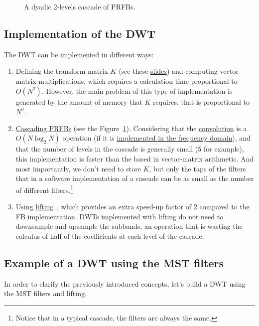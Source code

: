 \begin{figure}
  \centering
  \caption{A dyadic 2-levels cascade of PRFBs.}
  \label{fig:cascade}
\end{figure}

\subsection{Implementation of the DWT}
The DWT can be implemented in different ways:
\begin{enumerate}
\item Defining the transform matrix $K$ (see these
  \href{https://cseweb.ucsd.edu/classes/fa17/cse166-a/lec13.pdf}{slides})
  and computing vector-matrix multiplications, which requires a
  calculation time proportional to $O(N^2)$. However, the main problem
  of this type of implementation is generated by the amount of memory
  that $K$ requires, that is proportional to $N^2$.
\item
  \href{https://en.wikipedia.org/wiki/Discrete_wavelet_transform#Cascading_and_filter_banks}{Cascading
    PRFBs} (see the Figure~\ref{fig:cascade}). Considering that the
  \href{https://en.wikipedia.org/wiki/Convolution}{convolution} is a
  $O(N\log_2N)$ operation (if it is
  \href{https://en.wikipedia.org/wiki/Convolution_theorem}{implemented
    in the frequency domain}), and that the number of levels in the
  cascade is generally small (5 for example), this implementation is
  faster than the based in vector-matrix arithmetic. And most
  importantly, we don't need to store $K$, but only the taps of the
  filters that in a software implementation of a cascade can be as
  small as the number of different filters.\footnote{Notice that in a
    typical cascade, the filters are always the same.}
\item Using
  \href{https://en.wikipedia.org/wiki/Lifting_scheme}{lifting}~\cite{sweldens1997building},
  which provides an extra speed-up factor of 2 compared to the FB
  implementation. DWTs implemented with lifting do not need to
  downsample and upsample the subbands, an operation that is wasting
  the calculus of half of the coefficients at each level of the
  cascade.
\end{enumerate}

\subsection{Example of a DWT using the MST filters}
In order to clarify the previously introduced concepts, let's build a
DWT using the MST filters and lifting.

